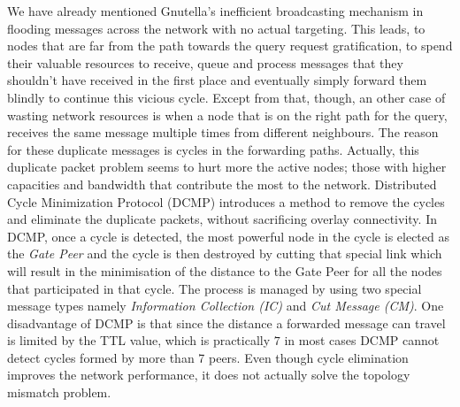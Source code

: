 \documentclass[acmcsur,acmnow]{acmtrans2m}
\begin{document}
We have already mentioned Gnutella's inefficient broadcasting mechanism in flooding messages across the network with no actual targeting. This leads, to nodes that are far from the path towards the query request gratification, to spend their valuable resources to receive, queue and process messages that they shouldn't have received in the first place and eventually simply forward them blindly to continue this vicious cycle. Except from that, though, an other case of wasting network resources is when a node that is on the right path for the query, receives the same message multiple times from different neighbours. The reason for these duplicate messages is cycles in the forwarding paths. Actually, this duplicate packet problem seems to hurt more the active nodes; those with higher capacities and bandwidth that contribute the most to the network. Distributed Cycle Minimization Protocol (DCMP) \cite{zhu_dcmp_2008} introduces a method to
remove the cycles and eliminate the duplicate packets, without sacrificing overlay
connectivity. In DCMP, once a cycle is detected, the most powerful node in the
cycle is elected as the \emph{Gate Peer} and the cycle is then destroyed by cutting that special link which will result in the minimisation of the distance to the Gate Peer for all the nodes that participated in that cycle. The process is managed by using two special message types namely \emph{Information Collection (IC)} and \emph{Cut Message (CM)}. One disadvantage of DCMP is that since the distance a forwarded message can travel is limited
by the TTL value, which is practically $7$ in most cases DCMP cannot detect
cycles formed by more than 7 peers. Even though cycle elimination improves the
network performance, it does not actually solve the topology mismatch problem.


%
%
\end{document}
